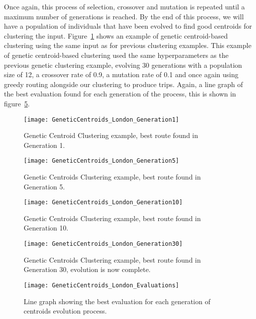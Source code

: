 \noindent
Once again, this process of selection, crossover and mutation is repeated until a maximum number of generations is reached.
By the end of this process, we will have a population of individuals that have been evolved to find good centroids
for clustering the input.
Figure~\ref{fig:GeneticCentroids_London_Generation1} shows an example of genetic centroid-based clustering using the same
input as for previous clustering examples.
This example of genetic centroid-based clustering used the same hyperparameters as the previous genetic clustering
example, evolving 30 generations with a population size of 12, a crossover rate of 0.9, a mutation rate of 0.1 and
once again using greedy routing alongside our clustering to produce trips.
Again, a line graph of the best evaluation found for each generation of the process, this is shown in
figure~\ref{fig:GeneticCentroids_London_Evaluations}.
\begin{figure}[H]
    \ContinuedFloat*
    \centering
    \texttt{[image: GeneticCentroids\_London\_Generation1]}
    \caption{Genetic Centroid Clustering example, best route found in Generation 1.}
    \label{fig:GeneticCentroids_London_Generation1}
\end{figure}
\begin{figure}[H]
    \ContinuedFloat
    \centering
    \texttt{[image: GeneticCentroids\_London\_Generation5]}
    \caption{Genetic Centroids Clustering example, best route found in Generation 5.}
    \label{fig:GeneticCentroids_London_Generation5}
\end{figure}
\begin{figure}[H]
    \ContinuedFloat
    \centering
    \texttt{[image: GeneticCentroids\_London\_Generation10]}
    \caption{Genetic Centroids Clustering example, best route found in Generation 10.}
    \label{fig:GeneticCentroids_London_Generation10}
\end{figure}
\begin{figure}[H]
    \ContinuedFloat
    \centering
    \texttt{[image: GeneticCentroids\_London\_Generation30]}
    \caption{Genetic Centroids Clustering example, best route found in Generation 30, evolution is now complete.}
    \label{fig:GeneticCentroids_London_Generation30}
\end{figure}
\begin{figure}[H]
    \centering
    \texttt{[image: GeneticCentroids\_London\_Evaluations]}
    \caption{Line graph showing the best evaluation for each generation of centroids evolution process.}
    \label{fig:GeneticCentroids_London_Evaluations}
\end{figure}
\noindent


